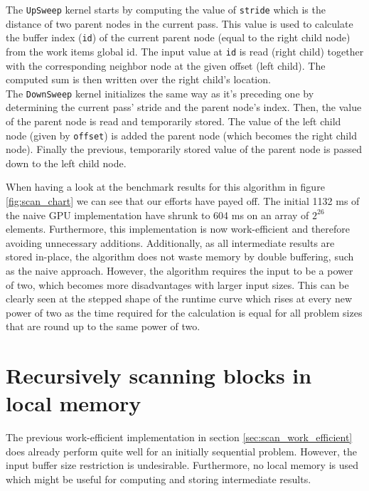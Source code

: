 The \lstinline!UpSweep! kernel starts by computing the value of \lstinline!stride! which is the distance of two parent nodes in the current pass. This value is used to calculate the buffer index (\lstinline!id!) of the current parent node (equal to the right child node) from the work items global id. The input value at \lstinline!id! is read (right child) together with the corresponding neighbor node at the given offset (left child). The computed sum is then written over the right child's location. \\
The \lstinline!DownSweep! kernel initializes the same way as it's preceding one by determining the current pass' stride and the parent node's index. Then, the value of the parent node is read and temporarily stored. The value of the left child node (given by \lstinline!offset!) is added the parent node (which becomes the right child node). Finally the previous, temporarily stored value of the parent node is passed down to the left child node.

When having a look at the benchmark results for this algorithm in figure \ref{fig:scan_chart} we can see that our efforts have payed off. The initial 1132 ms of the naive GPU implementation have shrunk to 604 ms on an array of $2^{26}$ elements. Furthermore, this implementation is now work-efficient and therefore avoiding unnecessary additions. Additionally, as all intermediate results are stored in-place, the algorithm does not waste memory by double buffering, such as the naive approach. However, the algorithm requires the input to be a power of two, which becomes more disadvantages with larger input sizes. %
This can be clearly seen at the stepped shape of the runtime curve which rises at every new power of two as the time required for the calculation is equal for all problem sizes that are round up to the same power of two.

\section{Recursively scanning blocks in local memory}
\label{sec:scan_recursive}

The previous work-efficient implementation in section \ref{sec:scan_work_efficient} does already perform quite well for an initially sequential problem. However, the input buffer size restriction is undesirable. Furthermore, no local memory is used which might be useful for computing and storing intermediate results.

